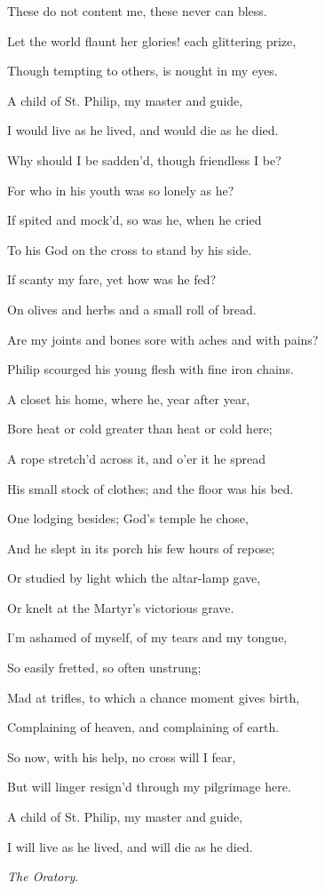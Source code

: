 These do not content me, these never can bless.

Let the world flaunt her glories! each glittering prize,

Though tempting to others, is nought in my eyes.

A child of St. Philip, my master and guide,

I would live as he lived, and would die as he died.

Why should I be sadden'd, though friendless I be?

For who in his youth was so lonely as he?

If spited and mock'd, so was he, when he cried

To his God on the cross to stand by his side. 

If scanty my fare, yet how was he fed?

On olives and herbs and a small roll of bread.

Are my joints and bones sore with aches and with pains?

Philip scourged his young flesh with fine iron chains.

A closet his home, where he, year after year,

Bore heat or cold greater than heat or cold here;

A rope stretch'd across it, and o'er it he spread

His small stock of clothes; and the floor was his bed.

One lodging besides; God's temple he chose,

And he slept in its porch his few hours of repose;

Or studied by light which the altar-lamp gave,

Or knelt at the Martyr's victorious grave.

I'm ashamed of myself, of my tears and my tongue,

So easily fretted, so often unstrung;

Mad at trifles, to which a chance moment gives birth,

Complaining of heaven, and complaining of earth. 

So now, with his help, no cross will I fear,

But will linger resign'd through my pilgrimage here.

A child of St. Philip, my master and guide,

I will live as he lived, and will die as he died.

\emph{The Oratory}.

